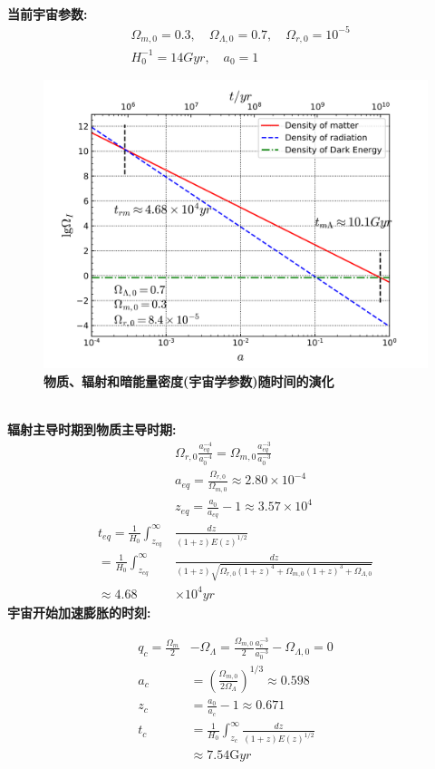 \documentclass[14pt]{article}
\begin{document}
\quad\\
\textbf{当前宇宙参数:}
\begin{align*}
    &\Omega_{m,0}=0.3,\quad \Omega_{\Lambda,0}=0.7,\quad \Omega_{r,0}=10^{-5}\\
    &H^{-1}_{0}=14Gyr,\quad a_{0}=1\tag{1.5.1}
\end{align*}
\begin{figure}[H]
\centering
\includegraphics[scale=1]{Era_rmL.png}
\caption{\textbf{物质、辐射和暗能量密度(宇宙学参数)随时间的演化}}
\end{figure}

\quad\\
\textbf{辐射主导时期到物质主导时期:}
\begin{align*}
&\Omega_{r,0}\displaystyle\frac{a^{-4}_{eq}}{a^{-4}_{0}}=\Omega_{m,0}\displaystyle\frac{a^{-3}_{eq}}{a^{-3}_{0}}\tag{1.5.2}\\
&a_{eq}=\frac{\Omega_{r,0}}{\Omega_{m,0}} \approx 2.80\times 10^{-4} \tag{1.5.3}\\
&z_{eq}=\frac{a_{0}}{a_{eq}}-1 \approx 3.57 \times 10^{4}\tag{1.5.4}\\
  t_{eq}=\frac{1}{H_{0}}\int^{\infty}_{z_{eq}}&\displaystyle\frac{dz}{(1+z)E(z)^{1/2}}\\
      =\frac{1}{H_{0}}\int^{\infty}_{z_{eq}}&\displaystyle\frac{dz}{(1+z)\sqrt{\Omega_{r,0}(1+z)^{4}+\Omega_{m,0}(1+z)^{3}+\Omega_{\Lambda,0}}}\\
      \approx 4.68&\times 10^{4}yr  \tag{1.5.5}
\end{align*}
\textbf{宇宙开始加速膨胀的时刻:}

\begin{align*}
    q_{c}=\frac{\Omega_{m}}{2}&-\Omega_{\Lambda}
    =\frac{\Omega_{m,0}}{2}\frac{a^{-3}_{c}}{a^{-3}_{0}}-\Omega_{\Lambda,0}=0\tag{1.5.6}\\
    a_{c}&=\displaystyle(\frac{\Omega_{m,0}}{2\Omega_{\Lambda}})^{1/3} \approx 0.598 \tag{1.5.7}\\
    z_{c}&=\frac{a_{0}}{a_{c}}-1\approx 0.671 \tag{1.5.8}\\
     t_{c}&=\frac{1}{H_{0}}\int^{\infty}_{z_{c}}\displaystyle\frac{dz}{(1+z)E(z)^{1/2}}\\
      &\approx 7.54 \mathrm{G} yr\tag{1.5.9}
\end{align*}
\end{document}
